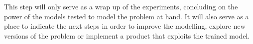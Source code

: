 This step will only serve as a wrap up of the experiments, concluding on the power of the models tested to model the problem at hand. It will also serve as a place to indicate the next steps in order to improve the modelling, explore new versions of the problem or implement a product that exploits the trained model.


